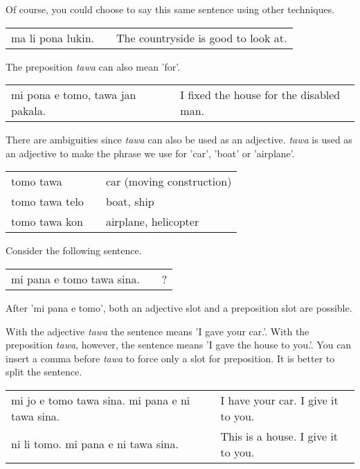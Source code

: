 Of course, you could choose to say this same sentence using other techniques.

\begin{supertabular}{p{5,5cm}|ll}
    ma li pona lukin. &  & The countryside is good to look at. \\
\end{supertabular}

%
The preposition \textit{tawa} can also mean 'for'.

\begin{supertabular}{p{5,5cm}|ll}
    mi pona e tomo, tawa jan pakala. &  & I fixed the house for the disabled man. \\
\end{supertabular}

%
There are ambiguities since \textit{tawa} can also be used as an adjective.
\textit{tawa} is used as an adjective to make the phrase we use for 'car', 'boat' or 'airplane'.

\begin{supertabular}{p{5,5cm}|ll}
    tomo tawa      &  & car (moving construction) \\
    tomo tawa telo &  & boat, ship                \\
    tomo tawa kon  &  & airplane, helicopter      \\
\end{supertabular}
%

Consider the following sentence.

\begin{supertabular}{p{5,5cm}|ll}
    mi pana e tomo tawa sina. &  & ? \\   %
\end{supertabular}

After 'mi pana e tomo', both an adjective slot and a preposition slot are possible.

With the adjective \textit{tawa} the sentence means 'I gave your car.'.
With the preposition \textit{tawa}, however, the sentence means 'I gave the house to you.'.
You can insert a comma before \textit{tawa} to force only a slot for preposition.
It is better to split the sentence.

\begin{supertabular}{p{5,5cm}|ll}
    mi jo e tomo tawa sina. mi pana e ni tawa sina. &  & I have your car. I give it to you. \\
    ni li tomo. mi pana e ni tawa sina.             &  & This is a house. I give it to you. \\
\end{supertabular}

